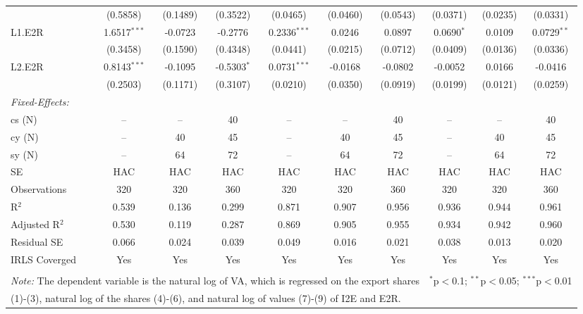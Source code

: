 \documentclass[a4paper]{article}
\begin{document}
\begin{table}[!t]
{\begin{tabular}[t]{lccccccccc}
  & (0.5858) & (0.1489) & (0.3522) & (0.0465) & (0.0460) & (0.0543) & (0.0371) & (0.0235) & (0.0331) \\ 
 L1.E2R & 1.6517$^{***}$ & -0.0723 & -0.2776 & 0.2336$^{***}$ & 0.0246 & 0.0897 & 0.0690$^{*}$ & 0.0109 & 0.0729$^{**}$ \\ 
  & (0.3458) & (0.1590) & (0.4348) & (0.0441) & (0.0215) & (0.0712) & (0.0409) & (0.0136) & (0.0336) \\ 
 L2.E2R & 0.8143$^{***}$ & -0.1095 & -0.5303$^{*}$ & 0.0731$^{***}$ & -0.0168 & -0.0802 & -0.0052 & 0.0166 & -0.0416 \\ 
  & (0.2503) & (0.1171) & (0.3107) & (0.0210) & (0.0350) & (0.0919) & (0.0199) & (0.0121) & (0.0259) \\ 
\midrule \emph{Fixed-Effects:} &   &   &   &   &   &  \\
cs (N) & -- & -- & 40 & -- & -- & 40 & -- & -- & 40\\
cy (N) & -- & 40 & 45 & -- & 40 & 45 & -- & 40 & 45\\
sy (N) & -- & 64 & 72 & -- & 64 & 72 & -- & 64 & 72\\
\midrule
SE & HAC & HAC & HAC &HAC &HAC &HAC &HAC &HAC &HAC \\
Observations & 320 & 320 & 360 & 320 & 320 & 360 & 320 & 320 & 360 \\ 
R$^{2}$ & 0.539 & 0.136 & 0.299 & 0.871 & 0.907 & 0.956 & 0.936 & 0.944 & 0.961 \\ 
Adjusted R$^{2}$ & 0.530 & 0.119 & 0.287 & 0.869 & 0.905 & 0.955 & 0.934 & 0.942 & 0.960 \\ 
Residual SE & 0.066 & 0.024 & 0.039 & 0.049 & 0.016 & 0.021 & 0.038 & 0.013 & 0.020 \\ 
IRLS Coverged & Yes & Yes & Yes & Yes & Yes & Yes & Yes & Yes & Yes \\ \bottomrule \\[-1em]
\multicolumn{7}{l}{\small \textit{Note:} The dependent variable is the natural log of VA, which is regressed on the  export shares}   & \multicolumn{3}{r}{$^{*}$p$<$0.1; $^{**}$p$<$0.05; $^{***}$p$<$0.01} \\ [-0.2em]
\multicolumn{10}{l}{\small \quad \quad \quad (1)-(3), natural log of the shares (4)-(6), and natural log of values (7)-(9) of I2E and E2R.} \\
\end{tabular} 
}
\end{table} 
\FloatBarrier
\end{document}
